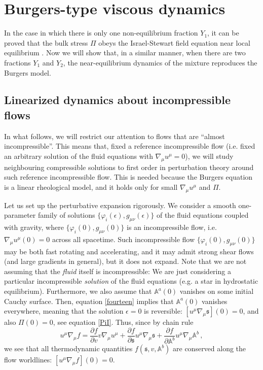 \documentclass[a4paper, amsfonts, amssymb, amsmath, reprint, showkeys, nofootinbib, twoside, onecolumn,notitlepage]{revtex4-1}
\begin{document}
\section{Burgers-type viscous dynamics}

In the case in which there is only one non-equilibrium fraction $Y_1$, it can be proved that the bulk stress $\Pi$ obeys the Israel-Stewart field equation near local equilibrium \cite{BulkGavassino,GavassinoUniversalityII2023,GavassinoFarFromBulk2023}. Now we will show that, in a similar manner, when there are two fractions $Y_1$ and $Y_2$, the near-equilibrium dynamics of the mixture reproduces the Burgers model.

\subsection{Linearized dynamics about incompressible flows}


In what follows, we will restrict our attention to flows that are ``almost incompressible''.  This means that, fixed a   reference incompressible flow (i.e. fixed an arbitrary solution of the fluid equations with $\nabla_\mu u^\mu=0$), we will study neighbouring compressible solutions to first order in perturbation theory around such reference incompressible flow. This is needed because the Burgers equation is a linear rheological model, and it holds only for small $\nabla_\mu u^\mu$ and $\Pi$.


Let us set up the perturbative expansion rigorously. We consider a smooth one-parameter family of solutions $\{\varphi_i (\epsilon),g_{\mu \nu}(\epsilon)\}$ of the fluid equations coupled with gravity, where $\{\varphi_i(0),g_{\mu \nu}(0)\}$ is an incompressible flow, i.e. $\nabla_\mu u^\mu(0)=0$ across all spacetime.  Such incompressible flow $\{\varphi_i(0),g_{\mu \nu}(0)\}$ may be both fast rotating and accelerating, and it may admit strong shear flows (and large gradients in general), but it does not expand. Note that we are not assuming that the \textit{fluid} itself is incompressible: We are just considering a particular incompressible \textit{solution} of the fluid equations (e.g. a star in hydrostatic equilibrium).  Furthermore, we also assume that $\mathbb{A}^a(0)$ vanishes on some initial Cauchy surface. Then, equation \eqref{fourteen} implies that $\mathbb{A}^a(0)$ vanishes everywhere, meaning that the solution $\epsilon=0$ is reversible: $[u^\mu\nabla_\mu \mathfrak{s}](0)=0$, and also $\Pi(0)=0$, see equation \eqref{PiI}. Thus, since by chain rule
\begin{equation}
u^\mu \nabla_\mu f= \dfrac{\partial f}{\partial v} v \nabla_\mu u^\mu + \dfrac{\partial f}{\partial \mathfrak{s}} u^\mu \nabla_\mu \mathfrak{s} + \dfrac{\partial f}{\partial \mathbb{A}^b} u^\mu \nabla_\mu \mathbb{A}^b \, ,
\end{equation}
we see that all thermodynamic quantities $f(\mathfrak{s},v,\mathbb{A}^b)$ are conserved along the flow worldlines: $[u^\mu \nabla_\mu f](0)=0$. 
\end{document}
